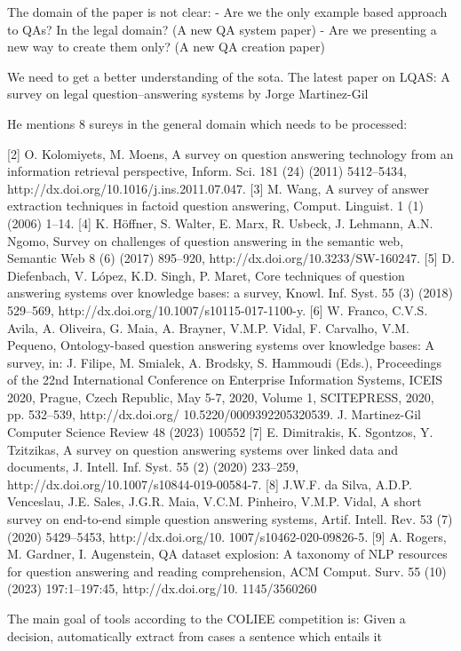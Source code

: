 The domain of the paper is not clear:
- Are we the only example based approach to QAs? In the legal domain? (A new QA system paper)
- Are we presenting a new way to create them only? (A new QA creation paper)

We need to get a better understanding of the sota. The latest paper on LQAS: A survey on legal question–answering systems by Jorge Martinez-Gil

He mentions 8 sureys in the general domain which needs to be processed:

[2] O. Kolomiyets, M. Moens, A survey on question answering technology
from an information retrieval perspective, Inform. Sci. 181 (24) (2011)
5412–5434, http://dx.doi.org/10.1016/j.ins.2011.07.047.
[3] M. Wang, A survey of answer extraction techniques in factoid question
answering, Comput. Linguist. 1 (1) (2006) 1–14.
[4] K. Höffner, S. Walter, E. Marx, R. Usbeck, J. Lehmann, A.N. Ngomo, Survey
on challenges of question answering in the semantic web, Semantic Web
8 (6) (2017) 895–920, http://dx.doi.org/10.3233/SW-160247.
[5] D. Diefenbach, V. López, K.D. Singh, P. Maret, Core techniques of question
answering systems over knowledge bases: a survey, Knowl. Inf. Syst. 55
(3) (2018) 529–569, http://dx.doi.org/10.1007/s10115-017-1100-y.
[6] W. Franco, C.V.S. Avila, A. Oliveira, G. Maia, A. Brayner, V.M.P. Vidal,
F. Carvalho, V.M. Pequeno, Ontology-based question answering systems
over knowledge bases: A survey, in: J. Filipe, M. Smialek, A. Brodsky, S.
Hammoudi (Eds.), Proceedings of the 22nd International Conference on
Enterprise Information Systems, ICEIS 2020, Prague, Czech Republic, May
5-7, 2020, Volume 1, SCITEPRESS, 2020, pp. 532–539, http://dx.doi.org/
10.5220/0009392205320539.
J. Martinez-Gil Computer Science Review 48 (2023) 100552
[7] E. Dimitrakis, K. Sgontzos, Y. Tzitzikas, A survey on question answering
systems over linked data and documents, J. Intell. Inf. Syst. 55 (2) (2020)
233–259, http://dx.doi.org/10.1007/s10844-019-00584-7.
[8] J.W.F. da Silva, A.D.P. Venceslau, J.E. Sales, J.G.R. Maia, V.C.M. Pinheiro,
V.M.P. Vidal, A short survey on end-to-end simple question answering
systems, Artif. Intell. Rev. 53 (7) (2020) 5429–5453, http://dx.doi.org/10.
1007/s10462-020-09826-5.
[9] A. Rogers, M. Gardner, I. Augenstein, QA dataset explosion: A taxonomy
of NLP resources for question answering and reading comprehension,
ACM Comput. Surv. 55 (10) (2023) 197:1–197:45, http://dx.doi.org/10.
1145/3560260

The main goal of tools according to the COLIEE competition is: Given a decision, automatically extract from cases a sentence which entails it

